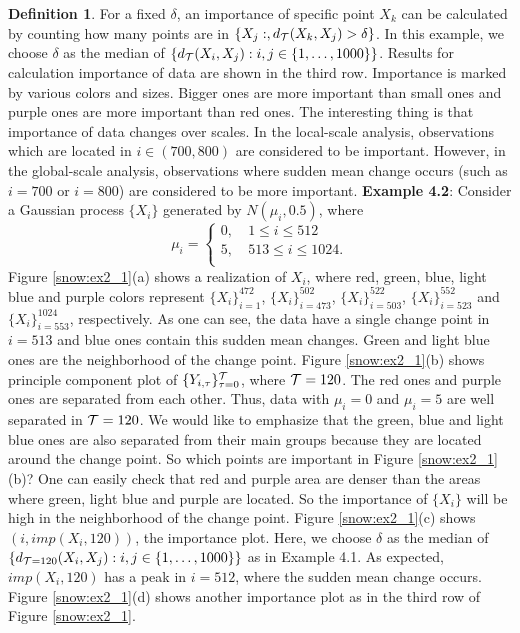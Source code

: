 \documentclass[preprint, review, 12pt]{article}
\theoremstyle{definition}
\newtheorem{dfn}{Definition}
\theoremstyle{remark}
\begin{document}
\begin{dfn}
For a fixed $\delta$, an importance of specific point $X_{k}$ can be calculated by counting how many points are in $\{X_j:,d_{\cal T}(X_{k},X_{j})>\delta\}$. In this example, we choose $\delta$ as the median of $\{d_{\cal T}(X_{i},X_{j}): i,j \in \{1,\dots,1000\} \}$. Results for calculation importance of data are shown in the third row. Importance is marked by various colors and sizes. Bigger ones are more important than small ones and purple ones are more important than red ones. The interesting thing is that importance of data changes over scales. In the local-scale analysis, observations which are located in $i \in (700,800)$ are considered to be important. However, in the global-scale analysis, observations where sudden mean change occurs (such as $i=700$ or $i=800$) are considered to be more important. 
\vskip 3mm
\noindent\textbf{Example 4.2}:
Consider a Gaussian process $\{X_i\}$ generated by $N(\mu_i,0.5)$, where 
$${\mu_i=\left\{
	\begin{array}{ll}
	0, &~1\le i \le 512\\
	5, &~513\le i \le 1024.\\
	\end{array}
	\right.}$$
Figure \ref{snow:ex2_1}(a) shows a realization of $X_i$, where red, green, blue, light blue and purple colors represent $\{X_i\}_{i=1}^{472}$,  $\{X_i\}_{i=473}^{502}$, $\{X_i\}_{i=503}^{522}$, $\{X_i\}_{i=523}^{552}$ and $\{X_i\}_{i=553}^{1024}$, respectively. As one  can see, the data have a single change point in $i=513$ and blue ones contain this sudden mean changes. Green and light blue ones are the neighborhood of the change point. Figure \ref{snow:ex2_1}(b) shows principle component plot of $\{Y_{i,\tau}\}_{\tau=0}^{\cal T}$, where ${\cal T}=120$. The red ones and purple ones are separated from each other. Thus, data with $\mu_i=0$ and $\mu_i=5$ are well separated in ${\cal T}=120$. We would like to emphasize that the green, blue and light blue ones are also separated from their main groups because they are located around the change point. So which points are important in Figure \ref{snow:ex2_1}(b)? One can easily check that red and purple area are denser than the areas where green, light blue and purple are located. So the importance of $\{X_i\}$ will be high in the neighborhood of the change point. Figure \ref{snow:ex2_1}(c) shows $(i,imp(X_i,120)) $, the importance plot. Here, we choose $\delta$ as the median of $\{d_{{\cal T}=120}(X_{i},X_{j}): i,j \in \{1,\dots,1000\} \}$ as in Example 4.1. As expected, $imp(X_i,120)$ has a peak in $i=512$, where the sudden mean change occurs. Figure \ref{snow:ex2_1}(d) shows another importance plot as in the third row of Figure \ref{snow:ex2_1}. 

\end{dfn}
\end{document}
